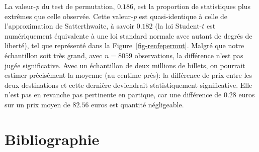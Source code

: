 \documentclass[
  11pt,
  letterpaper,
]{scrbook}
\theoremstyle{definition}
\theoremstyle{definition}
\theoremstyle{remark}
\begin{document}
La valeur-\emph{p} du test de permutation, \(0.186\), est la proportion
de statistiques plus extrêmes que celle observée. Cette valeur-\emph{p}
est quasi-identique à celle de l'approximation de Satterthwaite, à
savoir \(0.182\) (la loi Student-\(t\) est numériquement équivalente à
une loi standard normale avec autant de degrés de liberté), tel que
représenté dans la Figure~\ref{fig-renfepermut}. Malgré que notre
échantillon soit très grand, avec \(n=8059\) observations, la différence
n'est pas jugée significative. Avec un échantillon de deux millions de
billets, on pourrait estimer précisément la moyenne (au centime près):
la différence de prix entre les deux destinations et cette dernière
deviendrait statistiquement significative. Elle n'est pas en revanche
pas pertinente en partique, car une différence de \(0.28\) euros sur un
prix moyen de \(82.56\) euros est quantité négligeable.


\chapter*{Bibliographie}\label{bibliographie}

\end{document}

